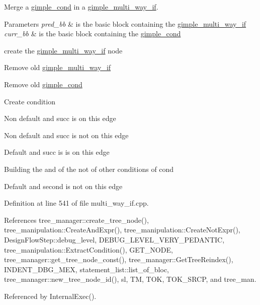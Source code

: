 Merge a \hyperlink{structgimple__cond}{gimple\+\_\+cond} in a \hyperlink{structgimple__multi__way__if}{gimple\+\_\+multi\+\_\+way\+\_\+if}. 


\begin{DoxyParams}{Parameters}
{\em pred\+\_\+bb} & is the basic block containing the \hyperlink{structgimple__multi__way__if}{gimple\+\_\+multi\+\_\+way\+\_\+if} \\
\hline
{\em curr\+\_\+bb} & is the basic block containing the \hyperlink{structgimple__cond}{gimple\+\_\+cond} \\
\hline
\end{DoxyParams}
create the \hyperlink{structgimple__multi__way__if}{gimple\+\_\+multi\+\_\+way\+\_\+if} node

Remove old \hyperlink{structgimple__multi__way__if}{gimple\+\_\+multi\+\_\+way\+\_\+if}

Remove old \hyperlink{structgimple__cond}{gimple\+\_\+cond}

Create condition

Non default and succ is on this edge

Non default and succ is not on this edge

Default and succ is is on this edge

Building the and of the not of other conditions of cond

Default and second is not on this edge 

Definition at line 541 of file multi\+\_\+way\+\_\+if.\+cpp.



References tree\+\_\+manager\+::create\+\_\+tree\+\_\+node(), tree\+\_\+manipulation\+::\+Create\+And\+Expr(), tree\+\_\+manipulation\+::\+Create\+Not\+Expr(), Design\+Flow\+Step\+::debug\+\_\+level, D\+E\+B\+U\+G\+\_\+\+L\+E\+V\+E\+L\+\_\+\+V\+E\+R\+Y\+\_\+\+P\+E\+D\+A\+N\+T\+IC, tree\+\_\+manipulation\+::\+Extract\+Condition(), G\+E\+T\+\_\+\+N\+O\+DE, tree\+\_\+manager\+::get\+\_\+tree\+\_\+node\+\_\+const(), tree\+\_\+manager\+::\+Get\+Tree\+Reindex(), I\+N\+D\+E\+N\+T\+\_\+\+D\+B\+G\+\_\+\+M\+EX, statement\+\_\+list\+::list\+\_\+of\+\_\+bloc, tree\+\_\+manager\+::new\+\_\+tree\+\_\+node\+\_\+id(), sl, TM, T\+OK, T\+O\+K\+\_\+\+S\+R\+CP, and tree\+\_\+man.



Referenced by Internal\+Exec().

